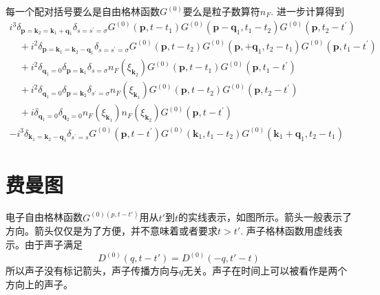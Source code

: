 \documentclass[a4paper,14pt]{article}
\begin{document}
每一个配对括号要么是自由格林函数$G^{(0)}$要么是粒子数算符$n_F$. 进一步计算得到
\begin{equation*}
  \begin{array}{l}
i^{3} \delta_{\mathbf{p}=\mathbf{k}_{2}=\mathbf{k}_{1}+\mathbf{q}_{1}} \delta_{s=s^{\prime}=\sigma} G^{(0)}\left(\mathbf{p}, t-t_{1}\right) G^{(0)}\left(\mathbf{p}-\mathbf{q}_{1}, t_{1}-t_{2}\right) G^{(0)}\left(\mathbf{p}, t_{2}-t^{\prime}\right) \\
\quad+i^{2} \delta_{\mathbf{p}=\mathbf{k}_{1}=\mathbf{k}_{2}-\mathbf{q}_{1}} \delta_{s=s^{\prime}=\sigma} G^{(0)}\left(\mathbf{p}, t-t_{2}\right) G^{(0)}\left(\mathbf{p},+\mathbf{q}_{1}, t_{2}-t_{1}\right) G^{(0)}\left(\mathbf{p}, t_{1}-t^{\prime}\right) \\
\quad+i^{2} \delta_{\mathbf{q}_{1}=0} \delta_{\mathbf{p}=\mathbf{k}_{1}} \delta_{s=\sigma} n_{F}\left(\xi_{\mathbf{k}_{2}}\right) G^{(0)}\left(\mathbf{p}, t-t_{1}\right) G^{(0)}\left(\mathbf{p}, t_{1}-t^{\prime}\right) \\
\quad+i^{2} \delta_{\mathbf{q}_{1}=0} \delta_{\mathbf{p}=\mathbf{k}_{2}} \delta_{s^{\prime}=\sigma} n_{F}\left(\xi_{\mathbf{k}_{1}}\right) G^{(0)}\left(\mathbf{p}, t-t_{2}\right) G^{(0)}\left(\mathbf{p}, t_{2}-t^{\prime}\right) \\
\quad+i \delta_{\mathbf{q}_{1}=0} \delta_{\mathbf{q}_{2}=0} n_{F}\left(\xi_{\mathbf{k}_{1}}\right) n_{F}\left(\xi_{\mathbf{k}_{2}}\right) G^{(0)}\left(\mathbf{p}, t-t^{\prime}\right) \\
-i^{3} \delta_{\mathbf{k}_{1}=\mathbf{k}_{2}-\mathbf{q}_{1}} \delta_{s^{\prime}=s} G^{(0)}\left(\mathbf{p}, t-t^{\prime}\right) G^{(0)}\left(\mathbf{k}_{1}, t_{1}-t_{2}\right) G^{(0)}\left(\mathbf{k}_{1}+\mathbf{q}_{1}, t_{2}-t_{1}\right)
\end{array}
\end{equation*}
\section{费曼图}
电子自由格林函数$G^{(0)(p,t-t')}$用从$t'$到$t$的实线表示，如图所示。箭头一般表示了方向。箭头仅仅是为了方便，并不意味着或者要求$t>t'$. 声子格林函数用虚线表示。由于声子满足
\begin{equation*}
    D^{(0)}(q,t-t')=D^{(0)}(-q,t'-t)
\end{equation*}
所以声子没有标记箭头，声子传播方向与$q$无关。声子在时间上可以被看作是两个方向上的声子。
\end{document}
